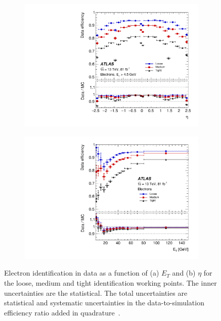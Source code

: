\begin{figure}[]
    \centering
    \begin{subfigure}[b]{0.49\textwidth}
        \centering
        \includegraphics[width=\textwidth]{figures/reconstruction/figures_electronID_id_effeta.pdf}
        \caption{}
        \label{fig:method:reco:idetaeff}
    \end{subfigure}
    \begin{subfigure}[b]{0.49\textwidth}
        \centering
        \includegraphics[width=\textwidth]{figures/reconstruction/figures_electronID_id_effpt.pdf}
        \caption{}
        \label{fig:method:reco:idpteff}
    \end{subfigure}
    \caption[Electron identification efficiency as a function of $\eta$ and as a function of $E_T$ for the identification working points]{Electron identification in data as a function of (a) $E_T$ and (b) $\eta$ for the loose, medium and tight identification working points. The inner uncertainties are the statistical. The total uncertainties are statistical and systematic uncertainties in the data-to-simulation efficiency ratio added in quadrature~\cite{Aad:2019tso}.}
    \label{fig:method:reco:ideff}
\end{figure}

